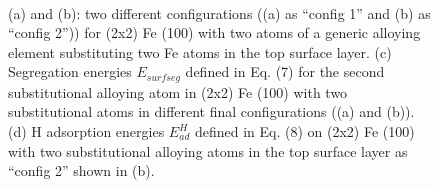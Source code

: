 \begingroup
\begin{figure}[!ht]
  \centering
  \label{Chap:Mg_H:fig:11a}
  \label{Chap:Mg_H:fig:11b}
  \\
  \label{Chap:Mg_H:fig:11c}
  \label{Chap:Mg_H:fig:11d}  
\caption[Effects of 6 p-block elements on higher surface alloying coverage]{(a) and (b): two different configurations ((a) as “config 1” and (b) as “config 2”)) for (2x2) Fe (100) with two atoms of a generic alloying element substituting two Fe atoms in the top surface layer. (c) Segregation energies $E_{surf seg}$ defined in Eq. (7) for the second substitutional alloying atom in (2x2) Fe (100) with two substitutional atoms in different final configurations ((a) and (b)). (d) H adsorption energies $E_{ad}^H$ defined in Eq. (8) on (2x2) Fe (100) with two substitutional alloying atoms in the top surface layer as “config 2” shown in (b).}
  \label{Chap:Mg_H:fig11}
\end{figure}
\endgroup

